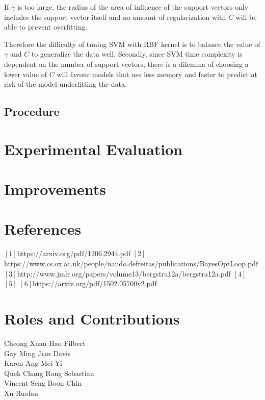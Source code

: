 \documentclass[letterpaper]{article}
\begin{document}
If $\gamma$ is too large, the radius of the area of influence of the support vectors only
includes the support vector itself and no amount of regularization with $\textit{C}$ will be
able to prevent overfitting.

Therefore the difficulty of tuning SVM with RBF kernel is to balance the value of
$\gamma$ and $\textit{C}$ to generalize the data well. Secondly, since SVM time complexity
is dependent on the number of support vectors, there is a dilemma of choosing a lower value
of $\textit{C}$ will favour models that use less memory and faster to predict at risk of
the model underfitting the data.

\subsection{Procedure}

\section{Experimental Evaluation}

\section{Improvements}

\section{References}
$[1]$https://arxiv.org/pdf/1206.2944.pdf
$[2]$https://www.cs.ox.ac.uk/people/nando.defreitas/publications/BayesOptLoop.pdf
$[3]$http://www.jmlr.org/papers/volume13/bergstra12a/bergstra12a.pdf
$[4]$
$[5]$
$[6]$https://arxiv.org/pdf/1502.05700v2.pdf


\section{Roles and Contributions}
\begin{description}
\item [Cheong Xuan Hao Filbert]
\item [Gay Ming Jian Davis]
\item [Karen Ang Mei Yi]
\item [Quek Chang Rong Sebastian]
\item [Vincent Seng Boon Chin]
\item [Xu Ruofan]
\end{description}



\end{document}
